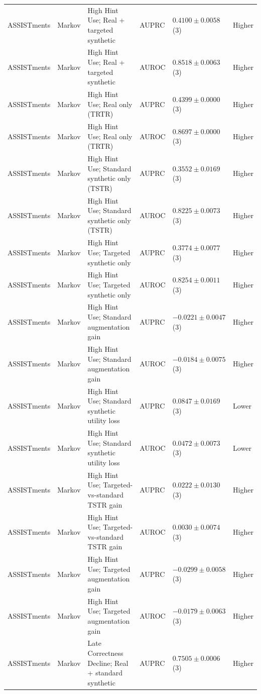 \begin{longtable}{@{}p{2.25cm}p{2.05cm}p{4.7cm}p{5.0cm}p{2.6cm}p{1.25cm}@{}}
ASSISTments & Markov & High Hint Use; Real + targeted synthetic & AUPRC & $0.4100 \mathbin{\pm} 0.0058$ (3) & Higher \\
ASSISTments & Markov & High Hint Use; Real + targeted synthetic & AUROC & $0.8518 \mathbin{\pm} 0.0063$ (3) & Higher \\
ASSISTments & Markov & High Hint Use; Real only (TRTR) & AUPRC & $0.4399 \mathbin{\pm} 0.0000$ (3) & Higher \\
ASSISTments & Markov & High Hint Use; Real only (TRTR) & AUROC & $0.8697 \mathbin{\pm} 0.0000$ (3) & Higher \\
ASSISTments & Markov & High Hint Use; Standard synthetic only (TSTR) & AUPRC & $0.3552 \mathbin{\pm} 0.0169$ (3) & Higher \\
ASSISTments & Markov & High Hint Use; Standard synthetic only (TSTR) & AUROC & $0.8225 \mathbin{\pm} 0.0073$ (3) & Higher \\
ASSISTments & Markov & High Hint Use; Targeted synthetic only & AUPRC & $0.3774 \mathbin{\pm} 0.0077$ (3) & Higher \\
ASSISTments & Markov & High Hint Use; Targeted synthetic only & AUROC & $0.8254 \mathbin{\pm} 0.0011$ (3) & Higher \\
ASSISTments & Markov & High Hint Use; Standard augmentation gain & AUPRC & $-0.0221 \mathbin{\pm} 0.0047$ (3) & Higher \\
ASSISTments & Markov & High Hint Use; Standard augmentation gain & AUROC & $-0.0184 \mathbin{\pm} 0.0075$ (3) & Higher \\
ASSISTments & Markov & High Hint Use; Standard synthetic utility loss & AUPRC & $0.0847 \mathbin{\pm} 0.0169$ (3) & Lower \\
ASSISTments & Markov & High Hint Use; Standard synthetic utility loss & AUROC & $0.0472 \mathbin{\pm} 0.0073$ (3) & Lower \\
ASSISTments & Markov & High Hint Use; Targeted-vs-standard TSTR gain & AUPRC & $0.0222 \mathbin{\pm} 0.0130$ (3) & Higher \\
ASSISTments & Markov & High Hint Use; Targeted-vs-standard TSTR gain & AUROC & $0.0030 \mathbin{\pm} 0.0074$ (3) & Higher \\
ASSISTments & Markov & High Hint Use; Targeted augmentation gain & AUPRC & $-0.0299 \mathbin{\pm} 0.0058$ (3) & Higher \\
ASSISTments & Markov & High Hint Use; Targeted augmentation gain & AUROC & $-0.0179 \mathbin{\pm} 0.0063$ (3) & Higher \\
ASSISTments & Markov & Late Correctness Decline; Real + standard synthetic & AUPRC & $0.7505 \mathbin{\pm} 0.0006$ (3) & Higher \\

\end{longtable}
